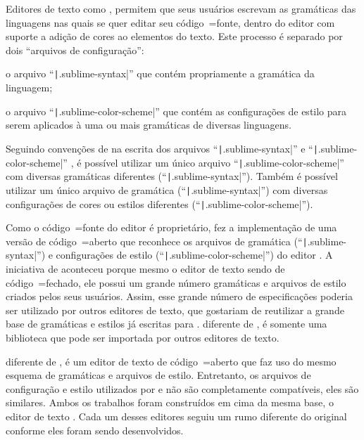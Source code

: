 Editores de texto como ,
permitem que seus usuários escrevam as gramáticas das linguagens nas quais se quer editar seu código~=fonte,
dentro do editor com suporte a adição de cores ao elementos do texto.
Este processo é separado por dois ``arquivos de configuração'':
\begin{inparaenum}[1)]
\item o arquivo ``\texttt|.sublime-syntax|'' que contém propriamente a gramática da linguagem;
\item o arquivo ``\texttt|.sublime-color-scheme|'' que contém as configurações de estilo para serem aplicados à uma ou
mais gramáticas de diversas linguagens.
\end{inparaenum}%
Seguindo convenções de na escrita dos arquivos ``\texttt|.sublime-syntax|'' \cite{sublimeTextScopeNaming} e
``\texttt|.sublime-color-scheme|'' \cite{sublimeTextColorSchemes},
é possível utilizar um único arquivo ``\texttt|.sublime-color-scheme|'' com diversas gramáticas diferentes (``\texttt|.sublime-syntax|'').
Também é possível utilizar um único arquivo  de gramática (``\texttt|.sublime-syntax|'') com diversas configurações de cores ou
estilos diferentes (``\texttt|.sublime-color-scheme|'').

Como o código~=fonte do editor  é proprietário,
 fez a implementação de uma versão de código~=aberto que reconhece os arquivos de gramática (``\texttt|.sublime-syntax|'') e
configurações de estilo (``\texttt|.sublime-color-scheme|'') do editor .
A iniciativa de  aconteceu porque mesmo o editor de texto  sendo de código~=fechado,
ele possui um grande número gramáticas e
arquivos de estilo criados pelos seus usuários.
Assim,
esse grande número de especificações poderia ser utilizado por outros editores de texto,
que gostariam de reutilizar a grande base de gramáticas e
estilos já escritas para .
 diferente de ,
é somente uma biblioteca que pode ser importada por outros editores de texto.

 diferente de ,
é um editor de texto de código~=aberto que faz uso do mesmo esquema de gramáticas e
arquivos de estilo.
Entretanto,
os arquivos de configuração e
estilo utilizados por  e
 não são completamente compatíveis,
eles são similares.
Ambos os trabalhos foram construídos em cima da mesma base,
o editor de texto .
Cada um desses editores seguiu um rumo diferente do original  conforme eles foram sendo desenvolvidos.

